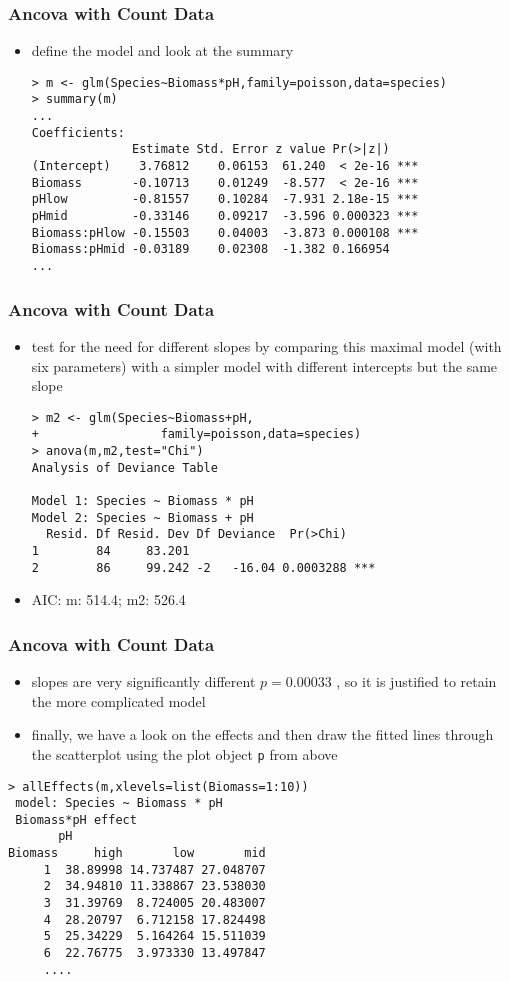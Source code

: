 \begin{frame}[fragile]\frametitle{Ancova with Count Data}
  \begin{itemize}
  \item define the model and look at the summary\small
\begin{verbatim}
> m <- glm(Species~Biomass*pH,family=poisson,data=species)
> summary(m)
...
Coefficients:
              Estimate Std. Error z value Pr(>|z|)    
(Intercept)    3.76812    0.06153  61.240  < 2e-16 ***
Biomass       -0.10713    0.01249  -8.577  < 2e-16 ***
pHlow         -0.81557    0.10284  -7.931 2.18e-15 ***
pHmid         -0.33146    0.09217  -3.596 0.000323 ***
Biomass:pHlow -0.15503    0.04003  -3.873 0.000108 ***
Biomass:pHmid -0.03189    0.02308  -1.382 0.166954    
...
\end{verbatim}
  \end{itemize}
\end{frame}

\begin{frame}[fragile]\frametitle{Ancova with Count Data}
  \begin{itemize}
  \item test for the need for different slopes by comparing this maximal model (with
six parameters) with a simpler model with different intercepts but the same slope
\begin{verbatim}
> m2 <- glm(Species~Biomass+pH,
+                 family=poisson,data=species)
> anova(m,m2,test="Chi")
Analysis of Deviance Table

Model 1: Species ~ Biomass * pH
Model 2: Species ~ Biomass + pH
  Resid. Df Resid. Dev Df Deviance  Pr(>Chi)    
1        84     83.201                          
2        86     99.242 -2   -16.04 0.0003288 ***
\end{verbatim}
\item AIC: m: 514.4; m2: 526.4 
  \end{itemize}
\end{frame}

\begin{frame}[fragile]\frametitle{Ancova with Count Data}
  \begin{itemize}
  \item slopes are very significantly different $p = 0.00033$ , so it is justified to retain the more complicated model
  \item finally, we have a look on the effects and then draw the fitted lines through the scatterplot using the plot object \texttt{p} from above
  \end{itemize}\small
\begin{verbatim}
> allEffects(m,xlevels=list(Biomass=1:10))
 model: Species ~ Biomass * pH
 Biomass*pH effect
       pH
Biomass     high       low       mid
     1  38.89998 14.737487 27.048707
     2  34.94810 11.338867 23.538030
     3  31.39769  8.724005 20.483007
     4  28.20797  6.712158 17.824498
     5  25.34229  5.164264 15.511039
     6  22.76775  3.973330 13.497847
     ....
\end{verbatim}
\end{frame}

